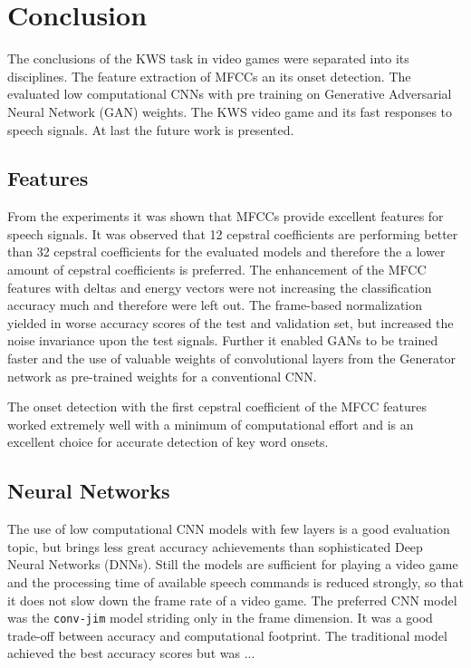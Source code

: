 
\chapter{Conclusion}\label{sec:conclusion}
The conclusions of the KWS task in video games were separated into its disciplines.
The feature extraction of MFCCs an its onset detection.
The evaluated low computational CNNs with pre training on Generative Adversarial Neural Network (GAN) weights.
The KWS video game and its fast responses to speech signals.
At last the future work is presented.


\section{Features}
\thesisStateNotReady
From the experiments it was shown that MFCCs provide excellent features for speech signals.
It was observed that 12 cepstral coefficients are performing better than 32 cepstral coefficients for the evaluated models and therefore the a lower amount of cepstral coefficients is preferred.
The enhancement of the MFCC features with deltas and energy vectors were not increasing the classification accuracy much and therefore were left out.
The frame-based normalization yielded in worse accuracy scores of the test and validation set, but increased the noise invariance upon the test signals.
Further it enabled GANs to be trained faster and the use of valuable weights of convolutional layers from the Generator network as pre-trained weights for a conventional CNN.

The onset detection with the first cepstral coefficient of the MFCC features worked extremely well with a minimum of computational effort and is an excellent choice for accurate detection of key word onsets.



\section{Neural Networks}
\thesisStateNotReady
The use of low computational CNN models with few layers is a good evaluation topic, but brings less great accuracy achievements than sophisticated Deep Neural Networks (DNNs).
Still the models are sufficient for playing a video game and the processing time of available speech commands is reduced strongly, so that it does not slow down the frame rate of a video game.
The preferred CNN model was the \texttt{conv-jim} model striding only in the frame dimension. It was a good trade-off between accuracy and computational footprint.
The traditional model achieved the best accuracy scores but was ...

